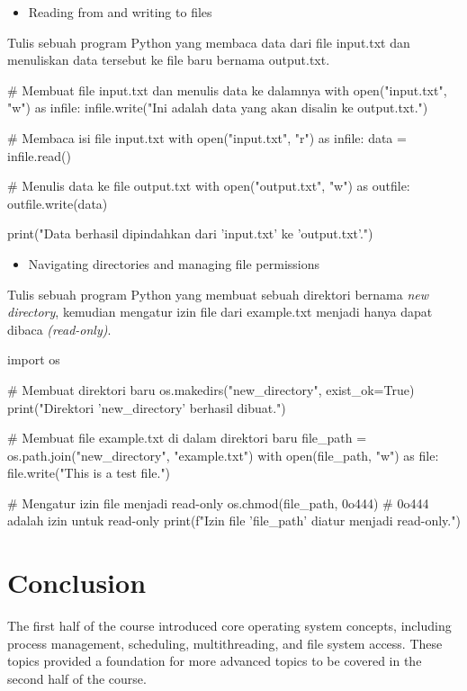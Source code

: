 \documentclass[12pt]{article}
\begin{document}
\begin{itemize}
    \item Reading from and writing to files
\end{itemize}
Tulis sebuah program Python yang membaca data dari file input.txt dan menuliskan data tersebut ke file baru bernama output.txt.

\begin{python}
    # Membuat file input.txt dan menulis data ke dalamnya
    with open("input.txt", "w") as infile:
        infile.write("Ini adalah data yang akan disalin ke output.txt.")

    # Membaca isi file input.txt
    with open("input.txt", "r") as infile:
        data = infile.read()

    # Menulis data ke file output.txt
    with open("output.txt", "w") as outfile:
        outfile.write(data)

    print("Data berhasil dipindahkan dari 'input.txt' ke 'output.txt'.")
\end{python}

\begin{itemize}
    \item Navigating directories and managing file permissions
\end{itemize}

Tulis sebuah program Python yang membuat sebuah direktori bernama \textit{new directory}, kemudian mengatur izin file dari example.txt menjadi hanya dapat dibaca \textit{(read-only)}.

\begin{python}
    import os

    # Membuat direktori baru
    os.makedirs("new_directory", exist_ok=True)
        print("Direktori 'new_directory' berhasil dibuat.")

    # Membuat file example.txt di dalam direktori baru
    file_path = os.path.join("new_directory", "example.txt")
    with open(file_path, "w") as file:
        file.write("This is a test file.")

    # Mengatur izin file menjadi read-only
    os.chmod(file_path, 0o444)  # 0o444 adalah izin untuk read-only
        print(f"Izin file '{file_path}' diatur menjadi read-only.")
\end{python}


\section{Conclusion}
The first half of the course introduced core operating system concepts, including process management, scheduling, multithreading, and file system access. These topics provided a foundation for more advanced topics to be covered in the second half of the course.
\end{document}
